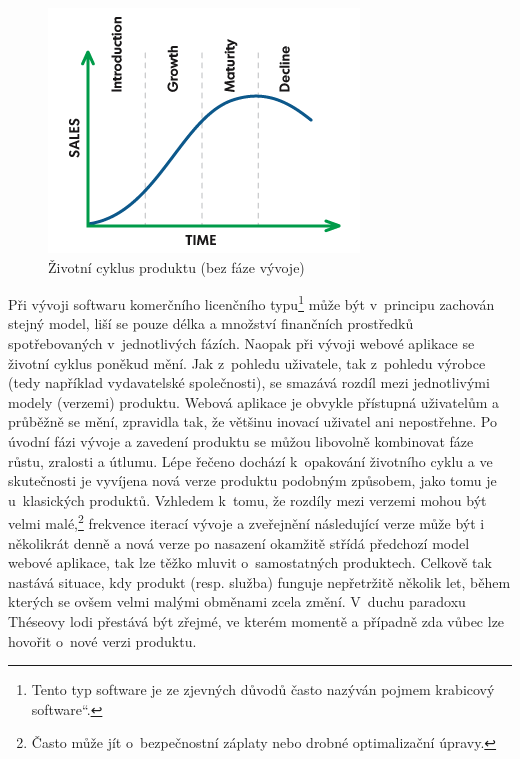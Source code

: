 \documentclass[12pt,twoside,openany]{fithesis}
\begin{document}
\begin{figure}[hbt]
    \hypertarget{fig-product-lifecycle}{}%
    \begin{center}

        
        \includegraphics[]{img/product-lifecycle-simple}
        \caption[{Životní cyklus produktu}]{Životní cyklus produktu (bez fáze vývoje) \cite{product-lifecycle-graph}}
        \label{fig-product-lifecycle}
    \end{center}
\end{figure}

Při vývoji softwaru komerčního licenčního 
typu\footnote{
    Tento typ software je ze zjevných důvodů často nazýván pojmem \glqq 
krabicový software\textquotedblleft{}.}
může být v~principu 
zachován stejný model, liší se pouze délka a množství finančních 
prostředků spotřebovaných v~jednotlivých fázích. Naopak při vývoji 
webové aplikace se životní cyklus poněkud mění. Jak z~pohledu uživatele, 
tak z~pohledu výrobce (tedy například vydavatelské společnosti), se 
smazává rozdíl mezi jednotlivými modely (verzemi) produktu. Webová 
aplikace je obvykle přístupná uživatelům a průběžně se mění, 
zpravidla tak, že většinu inovací uživatel ani nepostřehne. Po úvodní 
fázi vývoje a zavedení produktu se můžou libovolně kombinovat fáze 
růstu, zralosti a útlumu. Lépe řečeno dochází k~opakování životního 
cyklu a ve skutečnosti je vyvíjena nová verze produktu podobným způsobem, 
jako tomu je u~klasických produktů. Vzhledem k~tomu, že rozdíly mezi 
verzemi mohou být velmi 
malé,\footnote{
    Často může jít o~bezpečnostní záplaty nebo drobné optimalizační 
úpravy.
} frekvence iterací 
vývoje a zveřejnění následující verze může být i několikrát denně 
a nová verze po nasazení okamžitě střídá předchozí model webové 
aplikace, tak lze těžko mluvit o~samostatných produktech. Celkově tak 
nastává situace, kdy produkt (resp. služba) funguje nepřetržitě několik 
let, během kterých se ovšem velmi malými obměnami zcela změní. V~duchu 
paradoxu Théseovy lodi přestává být zřejmé, ve kterém momentě a 
případně zda vůbec lze hovořit o~nové verzi produktu. 
\cite{theseus-paradox}{}
\end{document}
